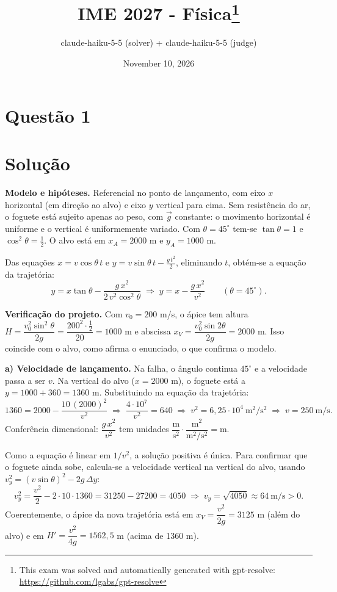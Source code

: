 \documentclass{article}%
\title{IME 2027 - Física\thanks{This exam was solved and automatically generated with gpt-resolve: \url{https://github.com/lgabs/gpt-resolve}}}%
\author{claude{-}haiku{-}5{-}5 (solver) + claude{-}haiku{-}5{-}5 (judge)}%
\date{November 10, 2026}%
\begin{document}
%
\normalsize%
\maketitle%
\section*{Questão 1}

\section*{Solução}

\textbf{Modelo e hipóteses.} Referencial no ponto de lançamento, com eixo $x$ horizontal (em direção ao alvo) e eixo $y$ vertical para cima. Sem resistência do ar, o foguete está sujeito apenas ao peso, com $\vec{g}$ constante: o movimento horizontal é uniforme e o vertical é uniformemente variado. Com $\theta = 45^\circ$ tem-se $\tan\theta = 1$ e $\cos^2\theta = \frac{1}{2}$. O alvo está em $x_A = 2000$ m e $y_A = 1000$ m.

Das equações $x = v\cos\theta\,t$ e $y = v\sin\theta\,t - \frac{g\,t^2}{2}$, eliminando $t$, obtém-se a equação da trajetória:
\[
y = x\tan\theta - \frac{g\,x^2}{2\,v^2\cos^2\theta} \;\Rightarrow\; y = x - \frac{g\,x^2}{v^2}\qquad (\theta = 45^\circ).
\]

\textbf{Verificação do projeto.} Com $v_0 = 200$ m/s, o ápice tem altura $H = \dfrac{v_0^2\sin^2\theta}{2g} = \dfrac{200^2\cdot\frac{1}{2}}{20} = 1000$ m e abscissa $x_V = \dfrac{v_0^2\sin 2\theta}{2g} = 2000$ m. Isso coincide com o alvo, como afirma o enunciado, o que confirma o modelo.

\textbf{a) Velocidade de lançamento.} Na falha, o ângulo continua $45^\circ$ e a velocidade passa a ser $v$. Na vertical do alvo ($x = 2000$ m), o foguete está a $y = 1000 + 360 = 1360$ m. Substituindo na equação da trajetória:
\[
1360 = 2000 - \frac{10\,(2000)^2}{v^2} \;\Rightarrow\; \frac{4\cdot 10^{7}}{v^2} = 640 \;\Rightarrow\; v^2 = 6{,}25\cdot 10^{4}\ \text{m}^2/\text{s}^2 \;\Rightarrow\; v = 250\ \text{m/s}.
\]
Conferência dimensional: $\dfrac{g\,x^2}{v^2}$ tem unidades $\dfrac{\text{m}}{\text{s}^2}\cdot\dfrac{\text{m}^2}{\text{m}^2/\text{s}^2} = \text{m}$.

Como a equação é linear em $1/v^2$, a solução positiva é única. Para confirmar que o foguete ainda sobe, calcula-se a velocidade vertical na vertical do alvo, usando $v_y^2 = (v\sin\theta)^2 - 2g\,\Delta y$:
\[
v_y^2 = \frac{v^2}{2} - 2\cdot 10\cdot 1360 = 31250 - 27200 = 4050 \;\Rightarrow\; v_y = \sqrt{4050}\approx 64\ \text{m/s} > 0.
\]
Coerentemente, o ápice da nova trajetória está em $x_V = \dfrac{v^2}{2g} = 3125$ m (além do alvo) e em $H' = \dfrac{v^2}{4g} = 1562{,}5$ m (acima de 1360 m).
\end{document}
